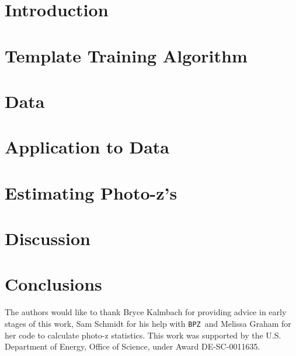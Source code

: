 \documentclass[twocolumn]{aastex63}
\newcommand{\pzcode}[1]{\texttt{#1}}
\newcommand{\bpz}{\pzcode{BPZ}}
\begin{document}



\section{Introduction}
    
    
\section{Template Training Algorithm}
    
        
\section{Data}
    

\section{Application to Data}
      
    
\section{Estimating Photo-z's}
    

\section{Discussion}
    
    
\section{Conclusions}
    

\acknowledgments

The authors would like to thank Bryce Kalmbach for providing advice in early stages of this work, Sam Schmidt for his help with \bpz\, and Melissa Graham for her code to calculate photo-z statistics.
This work was supported by the U.S. Department of Energy, Office of Science, under Award DE-SC-0011635.
\end{document}
